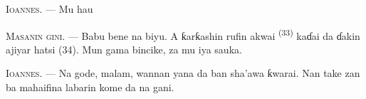 \textsc{Ioannes}. --- Mu hau 

\textsc{Masanin gini}. --- Babu bene na biyu. A ƙarƙashin rufin akwai
 \textsuperscript{(33)} kaɗai da ɗakin ajiyar
hatsi (34). Mun gama bincike, za mu iya sauka.

\textsc{Ioannes}. --- Na gode, malam, wannan yana da ban sha’awa
ƙwarai. Nan take zan ba mahaifina labarin kome da na gani.

\VUsaut{4.0mm}
\VUfilet{22mm}
